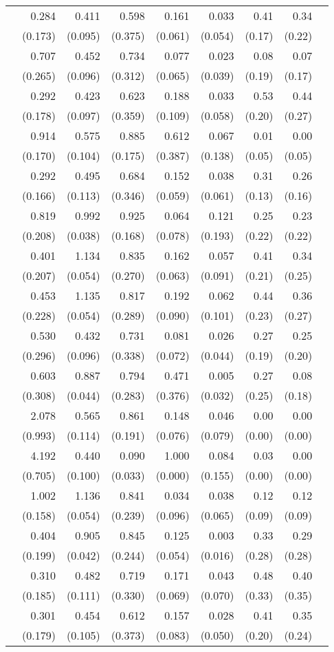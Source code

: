 \begin{longtable}{rrrrrrrrr}
\addlinespace[0.05cm] 48&0.284&0.411&0.598&0.161&0.033&0.41&0.34\\&(0.173)&(0.095)&(0.375)&(0.061)&(0.054)&(0.17)&(0.22) \\ \addlinespace[0.05cm] 49&0.707&0.452&0.734&0.077&0.023&0.08&0.07\\&(0.265)&(0.096)&(0.312)&(0.065)&(0.039)&(0.19)&(0.17) \\ \addlinespace[0.05cm] 50&0.292&0.423&0.623&0.188&0.033&0.53&0.44\\&(0.178)&(0.097)&(0.359)&(0.109)&(0.058)&(0.20)&(0.27) \\ \addlinespace[0.05cm] 51&0.914&0.575&0.885&0.612&0.067&0.01&0.00\\&(0.170)&(0.104)&(0.175)&(0.387)&(0.138)&(0.05)&(0.05) \\ \addlinespace[0.05cm] 52&0.292&0.495&0.684&0.152&0.038&0.31&0.26\\&(0.166)&(0.113)&(0.346)&(0.059)&(0.061)&(0.13)&(0.16) \\ \addlinespace[0.05cm] 53&0.819&0.992&0.925&0.064&0.121&0.25&0.23\\&(0.208)&(0.038)&(0.168)&(0.078)&(0.193)&(0.22)&(0.22) \\ \addlinespace[0.05cm] 54&0.401&1.134&0.835&0.162&0.057&0.41&0.34\\&(0.207)&(0.054)&(0.270)&(0.063)&(0.091)&(0.21)&(0.25) \\ \addlinespace[0.05cm] 55&0.453&1.135&0.817&0.192&0.062&0.44&0.36\\&(0.228)&(0.054)&(0.289)&(0.090)&(0.101)&(0.23)&(0.27) \\ \addlinespace[0.05cm] 56&0.530&0.432&0.731&0.081&0.026&0.27&0.25\\&(0.296)&(0.096)&(0.338)&(0.072)&(0.044)&(0.19)&(0.20) \\ \addlinespace[0.05cm] 57&0.603&0.887&0.794&0.471&0.005&0.27&0.08\\&(0.308)&(0.044)&(0.283)&(0.376)&(0.032)&(0.25)&(0.18) \\ \addlinespace[0.05cm] 58&2.078&0.565&0.861&0.148&0.046&0.00&0.00\\&(0.993)&(0.114)&(0.191)&(0.076)&(0.079)&(0.00)&(0.00) \\ \addlinespace[0.05cm] 59&4.192&0.440&0.090&1.000&0.084&0.03&0.00\\&(0.705)&(0.100)&(0.033)&(0.000)&(0.155)&(0.00)&(0.00) \\ \addlinespace[0.05cm] 60&1.002&1.136&0.841&0.034&0.038&0.12&0.12\\&(0.158)&(0.054)&(0.239)&(0.096)&(0.065)&(0.09)&(0.09) \\ \addlinespace[0.05cm] 61&0.404&0.905&0.845&0.125&0.003&0.33&0.29\\&(0.199)&(0.042)&(0.244)&(0.054)&(0.016)&(0.28)&(0.28) \\ \addlinespace[0.05cm] 62&0.310&0.482&0.719&0.171&0.043&0.48&0.40\\&(0.185)&(0.111)&(0.330)&(0.069)&(0.070)&(0.33)&(0.35) \\ \addlinespace[0.05cm] 63&0.301&0.454&0.612&0.157&0.028&0.41&0.35\\&(0.179)&(0.105)&(0.373)&(0.083)&(0.050)&(0.20)&(0.24) \\ 
\end{longtable}
